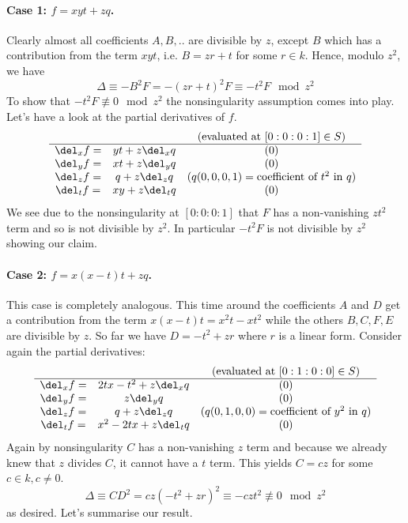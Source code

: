 \paragraph{Case 1: $f = xyt + zq$.} 
Clearly almost all coefficients $A,B,..$ are divisible by $z$, except $B$ which has a contribution from the term $xyt$, i.e. $B = zr + t$ for some $r\in k$.
Hence, modulo $z^2$, we have
\begin{equation}
\Delta \equiv -B^2F = -(zr+t)^2F \equiv -t^2F \mod z^2
\end{equation}
To show that $-t^2F \not\equiv 0 \mod z^2$ the nonsingularity assumption comes into play.
Let's have a look at the partial derivatives of $f$.
\begin{equation}
\begin{matrix}
         &  & \text{(evaluated at $[0:0:0:1] \in S$)} \\
\hline
\del_x f =& yt + z\del_x q & (0) \\
\del_y f =& xt + z\del_y q & (0) \\
\del_z f =& q + z\del_z q & (q(0,0,0,1) = \text{coefficient of $t^2$ in $q$}) \\
\del_t f =& xy + z\del_t q & (0)
\end{matrix}
\end{equation}
We see due to the nonsingularity at $[0:0:0:1]$ that $F$ has a non-vanishing $zt^2$ term and so is not divisible by $z^2$.
In particular $-t^2F$ is not divisible by $z^2$ showing our claim.

\paragraph{Case 2: $f = x(x-t)t + zq$.}
This case is completely analogous.
This time around the coefficients $A$ and $D$ get a contribution from the term $x(x-t)t = x^2t - xt^2$ while the others $B,C,F,E$ are divisible by $z$.
So far we have $D = -t^2 + zr$ where $r$ is a linear form.
Consider again the partial derivatives:
\begin{equation}
\begin{matrix}
         &  & \text{(evaluated at $[0:1:0:0] \in S$)} \\
\hline
\del_x f =& 2tx - t^2 + z\del_x q & (0) \\
\del_y f =& z\del_y q & (0) \\
\del_z f =& q + z\del_z q & (q(0,1,0,0) = \text{coefficient of $y^2$ in $q$}) \\
\del_t f =& x^2 - 2tx + z\del_t q & (0)
\end{matrix}
\end{equation}
Again by nonsingularity $C$ has a non-vanishing $z$ term and because we already knew that $z$ divides $C$, it cannot have a $t$ term.
This yields $C = cz$ for some $c\in k, c \neq 0$.
\begin{equation}
\Delta \equiv CD^2 = cz(-t^2+zr)^2 \equiv -czt^2  \not\equiv 0 \mod z^2
\end{equation}
as desired. Let's summarise our result.

